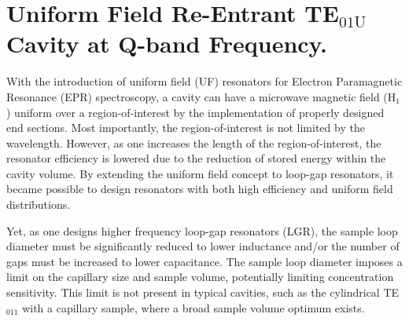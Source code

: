 \chapter[Uniform Field TE01U Cavity at Q-band Frequency]{Uniform Field Re-Entrant TE$_{01\text{U}}$ Cavity at Q-band Frequency.}

With the introduction of uniform field (UF) resonators for Electron Paramagnetic Resonance (EPR) spectroscopy, a cavity can have a microwave magnetic field (H$_1$) uniform over a region-of-interest by the implementation of properly designed end sections. \cite{mett2001axially, anderson2002, mett2002recav, hyde2004cavity} Most importantly, the region-of-interest is not limited by the wavelength. However, as one increases the length of the region-of-interest, the resonator efficiency is lowered due to the reduction of stored energy within the cavity volume. By extending the uniform field concept to loop-gap resonators,\cite{UFLGR} it became possible to design resonators with both high efficiency and uniform field distributions. \cite{UFLGR2017}  

Yet, as one designs higher frequency loop-gap resonators (LGR), the sample loop diameter must be significantly reduced to lower inductance and/or the number of gaps must be increased to lower capacitance. \cite{Sidabras2007, MainaliLGR, UFLGR2017} The sample loop diameter imposes a limit on the capillary size and sample volume, potentially limiting concentration sensitivity. This limit is not present in typical cavities, such as the cylindrical TE$_{011}$ with a capillary sample, where a broad sample volume optimum exists. \cite{Nesmelov2004} 

